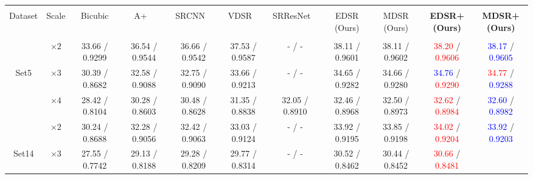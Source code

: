 \documentclass[10pt,twocolumn,letterpaper]{article}
\begin{document}
\begin{table*}[th]
		{\scriptsize
			\renewcommand{\arraystretch}{1.4}
			\setlength\tabcolsep{5pt}
			\begin{center}
				\begin{adjustbox}{width=1.1\textwidth, center=\textwidth+0.5cm}
					\begin{tabular} {|*{11}{c|}}
						\hline 
						&&&&& &&&&& \\ [-1em]
						Dataset & Scale & Bicubic &
						A+ ~\cite{timofte2014a+}&
						SRCNN ~\cite{dong2014learning}&
						VDSR ~\cite{kim2016accurate}&
						SRResNet ~\cite{ledig2016photo}&
						\parbox[c]{1.5cm}{\centering EDSR \\(Ours)} &
						\parbox[c]{1.5cm}{\centering MDSR \\(Ours)} &
						\parbox[c]{1.5cm}{\centering\textbf{EDSR+ \\(Ours)}} &
						\parbox[c]{1.5cm}{\centering\textbf{MDSR+ \\(Ours)}} \\ 
						&&&&& &&&&&\\ [-1em]
						\hline
						& $\times 2$ &
						33.66 / 0.9299 & 36.54 / 0.9544 & 36.66 / 0.9542 & 37.53 / 0.9587 & - / - &
						38.11 / 0.9601 & 
						38.11 / 0.9602 &
						\textcolor{red}{38.20} / \textcolor{red}{0.9606} & 
						\textcolor{blue}{38.17} / \textcolor{blue}{0.9605} \\
						Set5 & $\times 3$ &
						30.39 / 0.8682 & 32.58 / 0.9088 & 32.75 / 0.9090 & 33.66 / 0.9213 & - / - &
						34.65 / 0.9282 & 
						34.66 / 0.9280 &
						\textcolor{blue}{34.76} / \textcolor{red}{0.9290} &
						\textcolor{red}{34.77} / \textcolor{blue}{0.9288} \\
						& $\times 4$ &
						28.42 / 0.8104 & 30.28 / 0.8603 & 30.48 / 0.8628 & 31.35 / 0.8838 & 32.05 / 
						0.8910 & 
						32.46 / 0.8968 & 
						32.50 / 0.8973 &
						\textcolor{red}{32.62} / \textcolor{red}{0.8984} & 
						\textcolor{blue}{32.60} / \textcolor{blue}{0.8982} \\
						\hline
						& $\times 2$ &
						30.24 / 0.8688 & 32.28 / 0.9056 & 32.42 / 0.9063 & 33.03 / 0.9124 & - / - &
						33.92 / 0.9195 & 
						33.85 / 0.9198 &
						\textcolor{red}{34.02} / \textcolor{red}{0.9204} & 
						\textcolor{blue}{33.92} / \textcolor{blue}{0.9203} \\
						Set14 & $\times 3$ &
						27.55 / 0.7742 & 29.13 / 0.8188 & 29.28 / 0.8209 & 29.77 / 0.8314 & - / - &
						30.52 / 0.8462 & 
						30.44 / 0.8452 &
						\textcolor{red}{30.66} / \textcolor{red}{0.8481} & 

\end{tabular}
\end{adjustbox}
\end{center}}
\end{table*}
\end{document}

